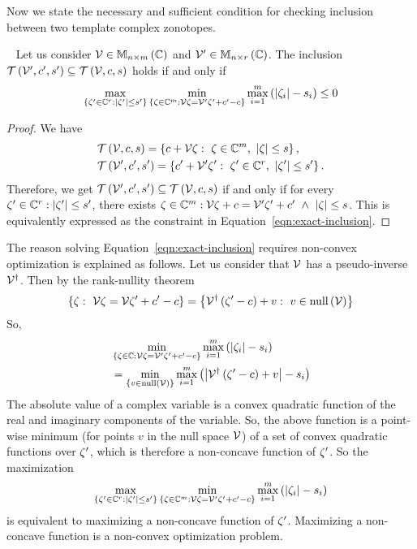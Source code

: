 Now we state the necessary and sufficient condition for checking
inclusion between two template complex zonotopes.
%
\begin{lemma}~\label{lem:exact-inclusion}
Let us consider $\mathcal{V}\in\mathbb{M}_{n\times m}\left(\mathbb{C}\right)$ and
$\mathcal{V}^\prime\in\mathbb{M}_{n\times r}\left(\mathbb{C}\right)$.  The inclusion
$\mathit{\operatorname{\mathcal{T}}}\left(\mathcal{V}^\prime,c^\prime,s^\prime\right)\subseteq\mathit{\operatorname{\mathcal{T}}}\left(\mathcal{V},c,s\right)$
holds if and only if
\begin{equation}\label{eqn:exact-inclusion}
\max_{\left\{\zeta^\prime\in\mathbb{C}^{r}:\left|\zeta^\prime\right|\leq s^\prime\right\}}\min_{\left\{\zeta\in\mathbb{C}^m:\mathcal{V}\zeta=\mathcal{V}^\prime\zeta^\prime+c^\prime-c\right\}}\max_{i=1}^m\left(\left|\zeta_i\right|-s_i\right)\leq 0
\end{equation}
\end{lemma}
%
\begin{proof}
  We have
  \begin{align*}
    &\mathit{\operatorname{\mathcal{T}}}\left(\mathcal{V},c,s\right)=\left\{c+\mathcal{V}\zeta:~\zeta\in\mathbb{C}^m,~\left|\zeta\right|\leq s\right\},\\
    &\mathit{\operatorname{\mathcal{T}}}\left(\mathcal{V}^\prime,c^\prime,s^\prime\right)=\left\{c^\prime+\mathcal{V}^\prime\zeta^\prime:~\zeta^\prime\in\mathbb{C}^r,~\left|\zeta^\prime\right|\leq s^\prime\right\}.
  \end{align*}
Therefore, we get
$\mathit{\operatorname{\mathcal{T}}}\left(\mathcal{V}^\prime,c^\prime,s^\prime\right)\subseteq\mathit{\operatorname{\mathcal{T}}}\left(\mathcal{V},c,s\right)$
if and only if
for every $\zeta^\prime\in\mathbb{C}^r:\left|\zeta^\prime\right|\leq s^\prime$,
there exists
$\zeta\in\mathbb{C}^m:\mathcal{V}\zeta+c=\mathcal{V}^\prime\zeta^\prime+c^\prime~\wedge~\left|\zeta\right|\leq
s$.  This is equivalently expressed as the constraint in Equation~\ref{eqn:exact-inclusion}.
\end{proof}
%
The reason solving Equation~\ref{eqn:exact-inclusion}
requires non-convex optimization is explained as follows.  Let us consider
that $\mathcal{V}$ has a pseudo-inverse ${\mathcal{V}}^\dagger$.  Then by the
rank-nullity theorem
%
\[
\left\{\zeta:~\mathcal{V}\zeta=\mathcal{V}\zeta^\prime+c^\prime-c\right\}=\left\{{\mathcal{V}}^\dagger\left(\zeta^\prime-c\right)+v:~v\in\operatorname{null}\left(\mathcal{V}\right)\right\}
\]
%
So,
%
\begin{align*}
& \min_{\left\{\zeta\in\mathbb{C}:\mathcal{V}\zeta=\mathcal{V}^\prime\zeta^\prime+c^\prime-c\right\}}\max_{i=1}^m\left(\left|\zeta_i\right|-s_i\right)\\
&
=\min_{\left\{v\in\operatorname{null}\left(\mathcal{V}\right)\right\}}\max_{i=1}^m\left(\left|{\mathcal{V}}^\dagger\left(\zeta^\prime-c\right)+v\right|-s_i\right)
\end{align*}
%
The absolute value of a complex variable is a convex quadratic
function of the real and imaginary components of the variable.  So,
the above function is a point-wise minimum (for points $v$ in the null
space $\null{\ptemp}$) of a set of convex quadratic functions over
$\zeta^\prime$, which is therefore a non-concave function of $\zeta^\prime$.
So the maximization
%
\[
\max_{\left\{\zeta^\prime\in\mathbb{C}^{r}:\left|\zeta^\prime\right|\leq s^\prime\right\}}\min_{\left\{\zeta\in\mathbb{C}^m:\mathcal{V}\zeta=\mathcal{V}^\prime\zeta^\prime+c^\prime-c\right\}}\max_{i=1}^m\left(\left|\zeta_i\right|-s_i\right)
\]
%
is equivalent to maximizing a non-concave function of $\zeta^\prime$.
Maximizing a non-concave function is a non-convex optimization problem.

